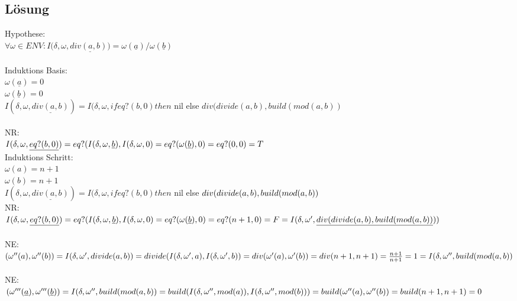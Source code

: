 \documentclass[12pt,runningheads,a4paper]{llncs}
\begin{document}
\subsection*{Lösung}
Hypothese:\\
$\forall \omega \in ENV: I(\delta, \omega, \underline{div(a,b))} = \omega(\underline{a})/\omega(\underline{b}) $
\\
\\
Induktions Basis:\\
$\omega(\underline{a}) = 0$\\
$\omega(\underline{b}) = 0$\\
$I(\delta, \omega, \underline{div(a,b)}) = I(\delta,\omega, if eq?(b,0) then$ nil else $ div(divide(a,b), build(mod(a,b))$\\
\\
NR: \\
$I(\delta, \omega, \underline{eq?(b,0)}) = eq?(I(\delta, \omega, \underline{b}), I(\delta, \omega, 0) \\
= eq?(\omega(\underline{b}),0)  \\
= eq?(0,0) \\
=T \\ $
\\
Induktions Schritt:\\
$\omega(a) = n+1 $ \\
$\omega(b) = n+1 $ \\
$I(\delta, \omega, \underline{div(a,b)}) = I(\delta,\omega, if     eq?(b,0) then$ nil else $div(divide(a,b), build(mod(a,b))\\$
\\
NR:\\
$I(\delta, \omega, \underline{eq?(b,0)}) = eq?(I(\delta, \omega, \underline{b}), I(\delta, \omega, 0) \\
= eq?(\omega(\underline{b}),0)  \\
= eq?(n+1,0) \\
=F \\
\\
= I(\delta, \omega', \underline{div(divide(a,b),build(mod(a,b))}))$\\
\\
NE:\\
$(\omega''(a),\omega''(b)) = I(\delta, \omega', divide(a,b)) = divide(I(\delta, \omega', a), I(\delta, \omega', b)) \\
= div(\omega'(a), \omega'(b))\\
= div(n+1, n+1)\\
= \frac{n+1}{n+1} = 1 \\
\\
=I(\delta, \omega'', build(mod(a,b))$\\
\\
NE:\\
$(\omega'''(\underline{a}),\omega'''(\underline{b})) = I(\delta, \omega'', build(mod(a,b)) \\
= build(I(\delta, \omega'', mod(a)), I(\delta, \omega'', mod(b)))\\
= build(\omega''(a), \omega''(b))\\
= build (n+1, n+1)\\
= 0$\\
\end{document}
